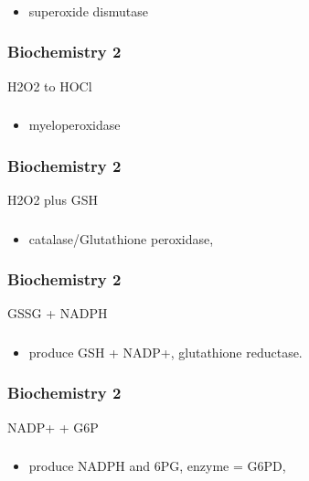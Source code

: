 \documentclass[11pt]{beamer}
\begin{document}
\begin{frame}
 \frametitle{}
\begin{itemize}
\item superoxide dismutase
\end{itemize}
\end{frame}

\begin{frame}
 \frametitle{Biochemistry 2}
H2O2 to HOCl
\end{frame}

\begin{frame}
 \frametitle{}
\begin{itemize}
\item myeloperoxidase
\end{itemize}
\end{frame}

\begin{frame}
 \frametitle{Biochemistry 2}
H2O2 plus GSH
\end{frame}

\begin{frame}
 \frametitle{}
\begin{itemize}
\item catalase/Glutathione peroxidase, 
\end{itemize}
\end{frame}

\begin{frame}
 \frametitle{Biochemistry 2}
GSSG + NADPH 
\end{frame}

\begin{frame}
 \frametitle{}
\begin{itemize}
\item produce GSH + NADP+, glutathione reductase. 
\end{itemize}
\end{frame}

\begin{frame}
 \frametitle{Biochemistry 2}
NADP+ + G6P
\end{frame}

\begin{frame}
 \frametitle{}
\begin{itemize}
\item produce NADPH and 6PG, enzyme = G6PD, 
\end{itemize}
\end{frame}
\end{document}
